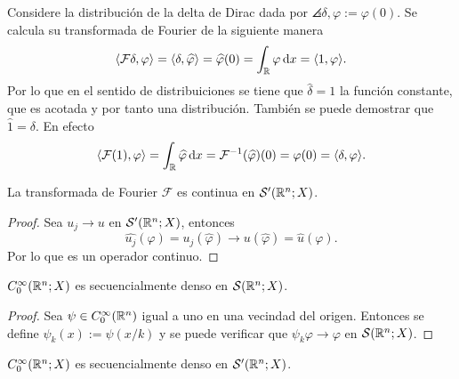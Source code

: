 \begin{example}
	Considere la distribución de la delta de Dirac dada por $\angles{\delta, \varphi} := \varphi(0)$.  Se calcula su transformada de Fourier de la siguiente manera
	\begin{equation*}
		\langle\mathcal{F}\delta, \varphi\rangle = \langle\delta, \widehat{\varphi}\rangle = \widehat{\varphi}(0) = \int_{\mathbb{R}} \varphi\mathop{}\!\mathrm{d} x = \langle1, \varphi\rangle.
	\end{equation*}
	Por lo que en el sentido de distribuiciones se tiene que $\widehat{\delta} = 1$ la función constante, que es acotada y por tanto una distribución. También se puede demostrar que $\widehat{1}  = \delta$. En efecto 
	\begin{equation*}
		\langle\mathcal{F}(1), \varphi\rangle = \int_{\mathbb{R}} \widehat{\varphi} \mathop{}\!\mathrm{d} x = 
		\mathcal{F}^{-1}(\widehat{\varphi})(0) = \varphi(0)  = \langle\delta, \varphi\rangle.
	\end{equation*}
\end{example}
\begin{theorem}
	La transformada de Fourier $\mathcal{F}$ es continua en $\mathcal{S}'(\mathbb{R}^n;X)$.
\end{theorem}
\begin{proof}
	Sea $u_j\rightarrow u$ en $\mathcal{S}'(\mathbb{R}^n;X)$, entonces
	\begin{equation*}
		\widehat{u_j}(\varphi) = u_j(\widehat{\varphi}) \rightarrow u(\widehat{\varphi}) = \widehat{u}(\varphi).
	\end{equation*}
	Por lo que es un operador continuo.
\end{proof}
\begin{lemma}
	$C^\infty_0(\mathbb{R}^n;X)$ es secuencialmente denso en $\mathcal{S}(\mathbb{R}^n;X)$.
\end{lemma}
\begin{proof}
	Sea $\psi\in C^\infty_0(\mathbb{R}^n)$ igual a uno en una vecindad del origen. Entonces se define $\psi_k(x) := \psi(x/k)$ y se puede verificar que $\psi_k\varphi\rightarrow\varphi$ en $\mathcal{S}(\mathbb{R}^n;X)$.
\end{proof}
\begin{theorem}
	$C^\infty_0(\mathbb{R}^n;X)$ es secuencialmente denso en $\mathcal{S}'(\mathbb{R}^n;X)$.
\end{theorem}
